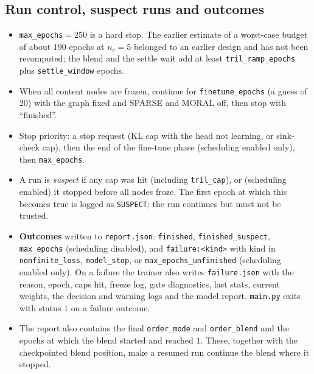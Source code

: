 \subsection{Run control, suspect runs and outcomes}
\label{sec:schedule:control}
\begin{itemize}[leftmargin=1.5em]
\item \texttt{max\_epochs}$=250$ is a hard stop. The earlier estimate of a worst-case
      budget of about $190$ epochs at $n_c=5$ belonged to an earlier design and has
      not been recomputed; the blend and the settle wait add at least
      \texttt{tril\_ramp\_epochs} plus \texttt{settle\_window} epochs.
\item When all content nodes are frozen, continue for \texttt{finetune\_epochs} (a
      guess of $20$) with the graph fixed and SPARSE and MORAL off, then stop with
      ``finished''.
\item Stop priority: a stop request (KL cap with the head not learning, or sink-check
      cap), then the end of the fine-tune phase (scheduling enabled only), then
      \texttt{max\_epochs}.
\item A run is \emph{suspect} if any cap was hit (including \texttt{tril\_cap}), or
      (scheduling enabled) it stopped before all nodes froze. The first epoch at which
      this becomes true is logged as \texttt{SUSPECT}; the run continues but must not
      be trusted.
\item \textbf{Outcomes} written to \texttt{report.json}: \texttt{finished},
      \texttt{finished\_suspect}, \texttt{max\_epochs} (scheduling disabled), and
      \texttt{failure:<kind>} with kind in \texttt{nonfinite\_loss},
      \texttt{model\_stop}, or \linebreak
      \texttt{max\_epochs\_unfinished} (scheduling enabled only). 
      On a failure the trainer also writes \linebreak
      \texttt{failure.json} with the
      reason, epoch, caps hit, freeze log, gate diagnostics, last stats, current
      weights, the decision and warning logs and the model report. \texttt{main.py}
      exits with status $1$ on a failure outcome.
\item The report also contains the final \texttt{order\_mode} and \texttt{order\_blend}
      and the epochs at which the blend started and reached $1$. These, together with
      the checkpointed blend position, make a resumed run continue the blend where it
      stopped.
\end{itemize}

